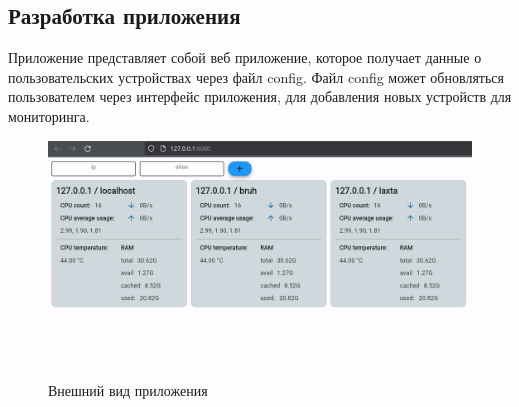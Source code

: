 \subsection*{Разработка приложения}

Приложение представляет собой веб приложение, которое получает данные о пользовательских устройствах через файл config.
Файл config может обновляться пользователем через интерфейс приложения, для добавления новых устройств для мониторинга.

\begin{figure}[H]
    \centering
    \includegraphics*[width=1\textwidth]{./img/image_2024-04-07_22-06-12.png}
    \caption{Внешний вид приложения}
\end{figure}
